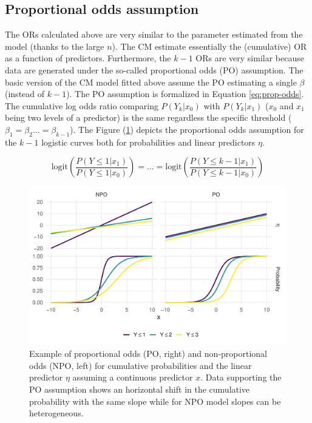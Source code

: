 \documentclass[
  man,floatsintext]{apa6}
\begin{document}
\normalsize

\subsection{Proportional odds assumption}\label{proportional-odds-assumption}

The ORs calculated above are very similar to the parameter estimated from the model (thanks to the large \(n\)). The CM estimate essentially the (cumulative) OR as a function of predictors. Furthermore, the \(k - 1\) ORs are very similar because data are generated under the so-called proportional odds (PO) assumption. The basic version of the CM model fitted above assume the PO estimating a single \(\beta\) (instead of \(k - 1\)). The PO assumption is formalized in Equation \eqref{eq:prop-odds}. The cumulative log odds ratio comparing \(P(Y_k|x_0)\) with \(P(Y_k|x_1)\) (\(x_0\) and \(x_1\) being two levels of a predictor) is the same regardless the specific threshold (\(\beta_1 = \beta_2 \dots = \beta_{k - 1}\)). The Figure (\ref{fig:fig-prop-odds}) depicts the proportional odds assumption for the \(k - 1\) logistic curves both for probabilities and linear predictors \(\eta\).

\begin{equation}
\text{logit} (\frac{P(Y \leq 1 |x_1)}{P(Y \leq 1 |x_0)}) = \dots = \text{logit} (\frac{P(Y \leq k - 1 |x_1)}{P(Y \leq k -1 |x_0)})
\label{eq:prop-odds}
\end{equation}

\scriptsize

\begin{figure}

{\centering \includegraphics[width=1\linewidth]{paper_files/figure-latex/fig-prop-odds-1} 

}

\caption{Example of proportional odds (PO, right) and non-proportional odds (NPO, left) for cumulative probabilities and the linear predictor \(\eta\) assuming a continuous predictor \(x\). Data supporting the PO assumption shows an horizontal shift in the cumulative probability with the same slope while for NPO model slopes can be heterogeneous.}\label{fig:fig-prop-odds}
\end{figure}
\end{document}

